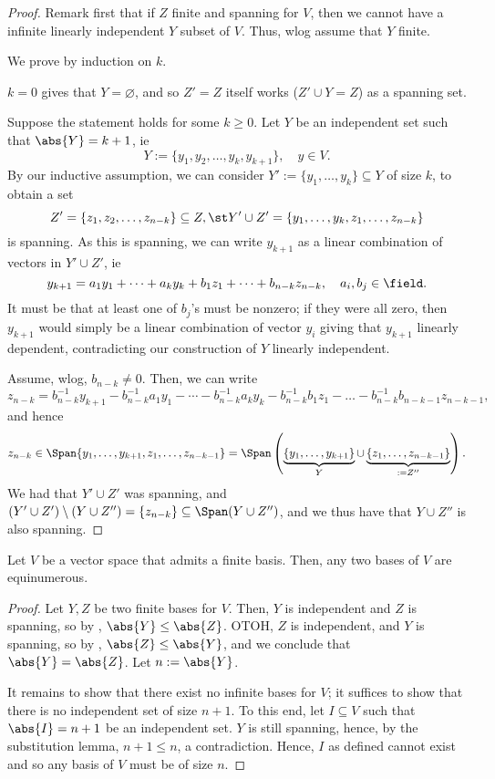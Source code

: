 \begin{proof}
    Remark first that if $Z$ finite and spanning for $V$, then we cannot have a infinite linearly independent $Y$ subset of $V$. Thus, wlog assume that $Y$ finite.
    
    We prove by induction on $k$.

    $k = 0$ gives that $Y = \varnothing$, and so $Z' = Z$ itself works ($Z' \cup Y = Z$) as a spanning set.

    Suppose the statement holds for some $k \geq 0$. Let $Y$ be an independent set such that $\abs{Y} = k + 1$, ie \[
    Y := \{y_1, y_2, \dots, y_k, y_{k+1}\}, \quad y \in V.
    \]
    By our inductive assumption, we can consider $Y' := \{y_1, \dots, y_k\} \subseteq Y$ of size $k$, to obtain a set \[
    Z' = \{z_1, z_2, \dots, z_{n-k}\} \subseteq Z, \st Y' \cup Z' = \{y_1, \dots, y_k, z_1, \dots, z_{n-k}\}
    \]
    is spanning. As this is spanning, we can write $y_{k+1}$ as a linear combination of vectors in $Y' \cup Z'$, ie \[
    y_{k+1} = a_1 y_1 + \dots + a_k y_k + b_1 z_1 + \dots + b_{n-k} z_{n-k}, \quad a_i, b_j \in \field.
    \]
    It must be that at least one of $b_j$'s must be nonzero; if they were all zero, then $y_{k+1}$ would simply be a linear combination of vector $y_i$ giving that $y_{k+1}$ linearly dependent, contradicting our construction of $Y$ linearly independent.

    Assume, wlog, $b_{n-k} \neq 0$. Then, we can write \[
    z_{n-k} = b_{n-k}^{-1}y_{k+1}-b_{n-k}^{-1}a_1y_{1}-\cdots - b_{n-k}^{-1}a_ky_k - b_{n-k}^{-1}b_1 z_1 - \dots - b_{n-k}^{-1}b_{n-k-1}z_{n-k-1},    
    \]
    and hence $$z_{n-k} \in \Span \{y_1, \dots, y_{k+1}, z_1, \dots, z_{n-k-1}\} = \Span \left(\underbrace{\{y_1, \dots, y_{k+1}\}}_{Y} \cup \underbrace{\{z_1, \dots, z_{n-k-1}\}}_{:= Z''} \right).$$
    We had that $Y' \cup Z'$ was spanning, and $(Y' \cup Z') \setminus (Y \cup Z'') = \{z_{n-k}\} \subseteq \Span (Y \cup Z'')$, and we thus have that $Y \cup Z''$ is also spanning.
\end{proof}

\begin{corollary}
    Let $V$ be a vector space that admits a finite basis. Then, any two bases of $V$ are equinumerous.
\end{corollary}

\begin{proof}
    Let $Y, Z$ be two finite bases for $V$. Then, $Y$ is independent and $Z$ is spanning, so by , $\abs{Y} \leq \abs{Z}$. OTOH, $Z$ is independent, and $Y$ is spanning, so by , $\abs{Z} \leq \abs{Y}$, and we conclude that $\abs{Y} = \abs{Z}$. Let $n := \abs{Y}$.

    It remains to show that there exist no infinite bases for $V$; it suffices to show that there is no independent set of size $n+1$. To this end, let $I \subseteq V$ such that $\abs{I} = n+1$ be an independent set. $Y$ is still spanning, hence, by the substitution lemma, $n + 1 \leq n$, a contradiction. Hence, $I$ as defined cannot exist and so any basis of $V$ must be of size $n$.
\end{proof}

